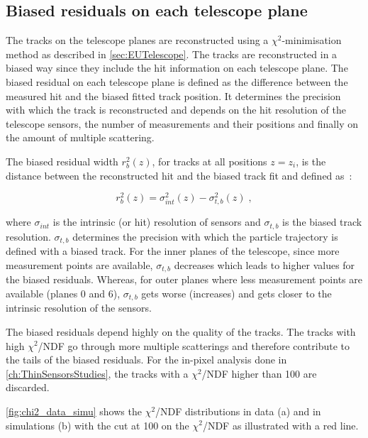\subsection{Biased residuals on each telescope plane}

The tracks on the telescope planes are reconstructed using a
$\chi^2$-minimisation method as described in
\cref{sec:EUTelescope}. The tracks are reconstructed in a biased way
since they include the hit information on each telescope plane. The
biased residual on each telescope plane is defined as the difference
between the measured hit and the biased fitted track position. It
determines the precision with which the track is reconstructed and
depends on the hit resolution of the telescope sensors, the number of
measurements and their positions and finally on the amount of multiple
scattering. 

The biased residual width $r_b^2(z)$, for tracks at all positions
$z=z_i$, is the distance between the reconstructed hit and the biased
track fit and defined as~\cite{Jansen:2016bkd}:

\begin{equation}
r_b^2(z)=\sigma_{int}^2(z)-\sigma_{t,b}^2(z) \; , 
\end{equation}

where $\sigma_{int}$ is the intrinsic (or hit) resolution of sensors
and $\sigma_{t,b}$ is the biased track resolution. $\sigma_{t,b}$
determines the precision with which the particle trajectory is defined
with a biased track. For the inner planes of the telescope, since more
measurement points are available, $\sigma_{t,b}$ decreases which leads
to higher values for the biased residuals. Whereas, for outer planes
where less measurement points are available (planes 0 and 6),
$\sigma_{t,b}$ gets worse (increases) and gets closer to the intrinsic
resolution of the sensors.

The biased residuals depend highly on the quality of the tracks. The
tracks with high $\chi^2$/NDF go through more multiple scatterings and
therefore contribute to the tails of the biased residuals. For the
in-pixel analysis done in \cref{ch:ThinSensorsStudies}, the tracks
with a $\chi^2$/NDF higher than 100 are discarded.

\cref{fig:chi2_data_simu} shows the $\chi^2$/NDF distributions in data
(a) and in simulations (b) with the cut at 100 on the $\chi^2$/NDF as
illustrated with a red line.

